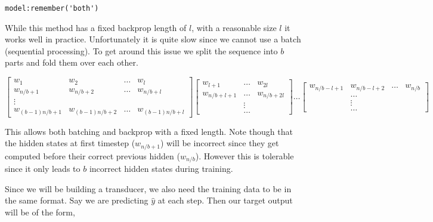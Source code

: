 \documentclass[11pt]{article}
\begin{document}
\begin{lstlisting}
model:remember('both')
\end{lstlisting}

While this method has a fixed backprop length of $l$, with a reasonable 
size $l$ it works well in practice. Unfortunately it is quite slow since 
we cannot use a batch (sequential processing). To get around this issue 
we split the sequence into $b$ parts and fold them over each other. 



\[
  \begin{bmatrix}
    w_1 & w_2 & \ldots & w_{l}\\
    w_{n/b+1} & w_{n/b+2} & \ldots & w_{n/b+l}\\
    \vdots \\
    w_{(b-1)n/b + 1} & w_{(b-1)n/b+2} & \ldots & w_{(b-1)n/b+l}
  \end{bmatrix}   \begin{bmatrix}
    w_{l+1} &  \ldots & w_{2l} \\
    w_{n/b+l+1} &  \ldots & w_{n/b+2l}\\
    & \vdots & \\
    & \ldots &  
  \end{bmatrix}
  \ldots
  \begin{bmatrix}
    w_{n/b-l+1} & w_{n/b-l+2} & \ldots & w_{n/b}\\
    & \ldots & \\
    & \vdots & \\
    & \ldots & 
  \end{bmatrix}
\] 

This allows both batching and backprop with a fixed length. Note
though that the hidden states at first timestep ($w_{n/b+1}$)
will be incorrect since they get computed before their correct
previous hidden ($w_{n/b}$). However this is tolerable since it
only leads to $b$ incorrect hidden states during training.




Since we will be building a transducer, we also need the training 
data to be in the same format. Say we are predicting $\hat{y}$ at 
each step. Then our target output will be of the form, 
\end{document}
